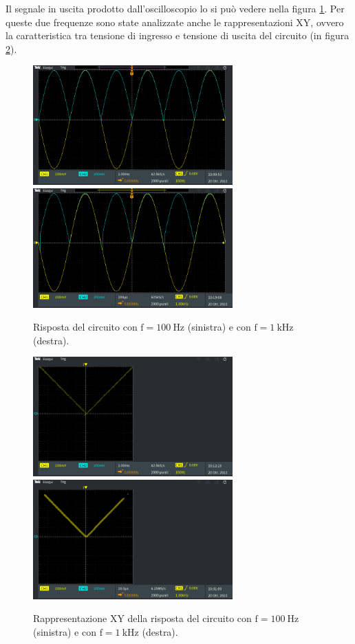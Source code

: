 \documentclass{report}
\begin{document}
Il segnale in uscita prodotto dall'oscilloscopio lo si può vedere nella figura \ref{figura:uscita11}. Per queste due frequenze sono state analizzate anche le rappresentazioni XY, ovvero la caratteristica tra tensione di ingresso e tensione di uscita del circuito (in figura \ref{figura:xyuscita1}).
\begin{figure}[h!]
	\centering
	\includegraphics[height=4.6cm]{immagini/TEK00000}
	\includegraphics[height=4.6cm]{immagini/TEK00003}
	\caption{Risposta del circuito con $\mathrm{f= \SI{100}{\hertz}}$ (sinistra) e con $\mathrm{f= \SI{1}{k\hertz}}$ (destra).}
	\label{figura:uscita11}
\end{figure}
\begin{figure}[h!]
	\centering
	\includegraphics[height=4.6cm]{immagini/TEK00001}
	\includegraphics[height=4.6cm]{immagini/TEK00010}
	\caption{Rappresentazione XY della risposta del circuito con $\mathrm{f= \SI{100}{\hertz}}$ (sinistra) e con $\mathrm{f= \SI{1}{k\hertz}}$ (destra).}
	\label{figura:xyuscita1}
\end{figure}
\end{document}
